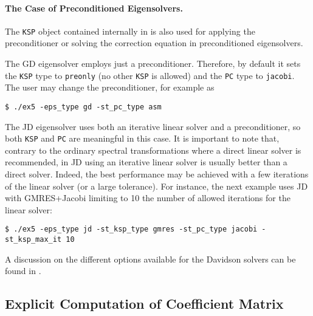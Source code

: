 \paragraph{The Case of Preconditioned Eigensolvers.}

	The \texttt{KSP} object contained internally in  is also used for applying the preconditioner or solving the correction equation in preconditioned eigensolvers.

	The GD eigensolver employs just a preconditioner. Therefore, by default it sets the \texttt{KSP} type to \texttt{preonly} (no other \texttt{KSP} is allowed) and the \texttt{PC} type to \texttt{jacobi}. The user may change the preconditioner, for example as
\begin{Verbatim}[fontsize=\small]
	$ ./ex5 -eps_type gd -st_pc_type asm
\end{Verbatim}

	The JD eigensolver uses both an iterative linear solver and a preconditioner, so both \texttt{KSP} and \texttt{PC} are meaningful in this case. It is important to note that, contrary to the ordinary spectral transformations where a direct linear solver is recommended, in JD using an iterative linear solver is usually better than a direct solver. Indeed, the best performance may be achieved with a few iterations of the linear solver (or a large tolerance). For instance, the next example uses JD with GMRES+Jacobi limiting to 10 the number of allowed iterations for the linear solver:
\begin{Verbatim}[fontsize=\small]
	$ ./ex5 -eps_type jd -st_ksp_type gmres -st_pc_type jacobi -st_ksp_max_it 10
\end{Verbatim}
A discussion on the different options available for the Davidson solvers can be found in \citep{Romero:2014:PID}.

\subsection{Explicit Computation of Coefficient Matrix}
\label{sec:explicit}

